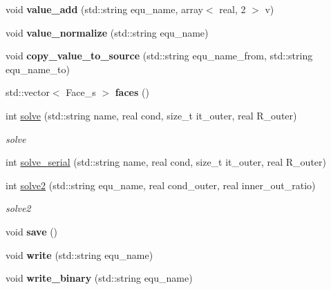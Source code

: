\begin{DoxyCompactItemize}
\item 
\hypertarget{classProb_a8dd6bf7649956711e74ccc58957186d8}{void {\bfseries value\+\_\+add} (std\+::string equ\+\_\+name, array$<$ real, 2 $>$ v)}\label{classProb_a8dd6bf7649956711e74ccc58957186d8}

\item 
\hypertarget{classProb_ad0c1ce9a1ffc181bf289aed404a2bb45}{void {\bfseries value\+\_\+normalize} (std\+::string equ\+\_\+name)}\label{classProb_ad0c1ce9a1ffc181bf289aed404a2bb45}

\item 
\hypertarget{classProb_a7bb25a9a766484c678d7e23e4b5ea4a7}{void {\bfseries copy\+\_\+value\+\_\+to\+\_\+source} (std\+::string equ\+\_\+name\+\_\+from, std\+::string equ\+\_\+name\+\_\+to)}\label{classProb_a7bb25a9a766484c678d7e23e4b5ea4a7}

\item 
\hypertarget{classProb_ac298114d98ebe5296ede77dafc3f4df3}{std\+::vector$<$ Face\+\_\+s $>$ {\bfseries faces} ()}\label{classProb_ac298114d98ebe5296ede77dafc3f4df3}

\item 
int \hyperlink{classProb_ad4de9e5a4bf13c03e2ba243b884b75d7}{solve} (std\+::string name, real cond, size\+\_\+t it\+\_\+outer, real R\+\_\+outer)
\begin{DoxyCompactList}\small\item\em solve \end{DoxyCompactList}\item 
int \hyperlink{classProb_ad16bc67a7a966dd5b6ba38afbe85a860}{solve\+\_\+serial} (std\+::string name, real cond, size\+\_\+t it\+\_\+outer, real R\+\_\+outer)
\item 
int \hyperlink{classProb_a3d2e422acfd8bf712d7fca87c5bc04ca}{solve2} (std\+::string equ\+\_\+name, real cond\+\_\+outer, real inner\+\_\+out\+\_\+ratio)
\begin{DoxyCompactList}\small\item\em solve2 \end{DoxyCompactList}\item 
\hypertarget{classProb_a187e846a4f4eed21758efaa63ede9ec1}{void {\bfseries save} ()}\label{classProb_a187e846a4f4eed21758efaa63ede9ec1}

\item 
\hypertarget{classProb_ad790058d97221b21c665d550650c15ad}{void {\bfseries write} (std\+::string equ\+\_\+name)}\label{classProb_ad790058d97221b21c665d550650c15ad}

\item 
\hypertarget{classProb_a06e9e4b07d84c253b313b6d490776353}{void {\bfseries write\+\_\+binary} (std\+::string equ\+\_\+name)}\label{classProb_a06e9e4b07d84c253b313b6d490776353}

\end{DoxyCompactItemize}
